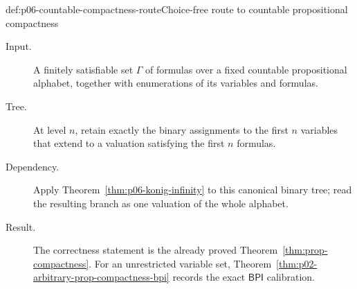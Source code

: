 \begin{hbmethod}{def:p06-countable-compactness-route}{Choice-free route to countable propositional compactness}
\begin{description}
  \item[Input.] A finitely satisfiable set \(\Gamma\) of formulas over a fixed
        countable propositional alphabet, together with enumerations of its
        variables and formulas.
  \item[Tree.] At level \(n\), retain exactly the binary assignments to the
        first \(n\) variables that extend to a valuation satisfying the first
        \(n\) formulas.
  \item[Dependency.] Apply Theorem~\ref{thm:p06-konig-infinity} to this
        canonical binary tree; read the resulting branch as one valuation of
        the whole alphabet.
  \item[Result.] The correctness statement is the already proved
        Theorem~\ref{thm:prop-compactness}.  For an unrestricted variable set,
        Theorem~\ref{thm:p02-arbitrary-prop-compactness-bpi} records the exact
        \(\mathsf{BPI}\) calibration.
\end{description}
\end{hbmethod}
